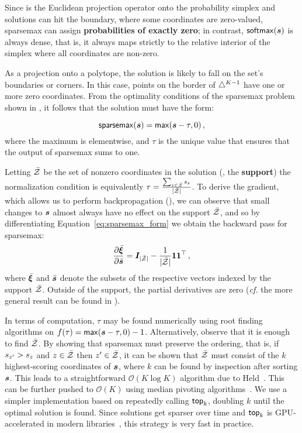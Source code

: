 Since
 is the Euclidean projection operator onto the probability
simplex and solutions can hit the boundary, where some coordinates are zero-valued, sparsemax can assign {\bf
        probabilities of exactly zero}; in contrast, $\softmax(\s)$
is always dense, that is, it always maps strictly
to the relative interior of the simplex where all coordinates are non-zero.

As a projection onto a polytope, the solution is likely to fall on the
set's boundaries or corners. In this case, points on the border of
$\simplex^{K-1}$ have one or more zero coordinates.
From the optimality conditions of the sparsemax problem shown in ,
it follows that the solution must have the form:

\begin{lemma}
    \begin{equation}\label{eq:sparsemax_form}
        \sparsemax(\s) = \max(\s - \tau, 0)\,,
    \end{equation}
    where the maximum is elementwise, and $\tau$ is the unique value that
    ensures that the output of sparsemax sums to one.
\end{lemma}

Letting $\bar{\ZZ}$ be the set of
nonzero coordinates in the solution (\ie, the \textbf{support}) the
normalization condition is equivalently $\tau = \frac{\sum_{z \in
            \bar{\ZZ}} \ss_z}{|\bar{\ZZ}|}$.
To derive the gradient, which allows us to perform backpropagation
(), we can observe that small changes to $\s$ almost always have no effect on the support
$\bar{\ZZ}$, and so by differentiating Equation~\ref{eq:sparsemax_form} we obtain the backward pass for sparsemax:
\begin{equation}
    \pfrac{\bar{\pv}}{\bar{\s}} = \bm{I}_{|\bar{\ZZ}|} - \frac{1}{|\bar{\ZZ}|}
    \bm{11}^\top\,,
\end{equation}
where $\bar{\pv}$ and ${\bar{\s}}$ denote the subsets of the respective vectors
indexed by the support $\bar{\ZZ}$. Outside of the support, the partial
derivatives are zero (\emph{cf.} the more general result can be found in \citet[Proposition
    2]{entmax}).

In terms of computation, $\tau$ may be found numerically using root finding
algorithms on $f(\tau) = \max(\s - \tau, 0) - 1$.
Alternatively, observe that it is enough to find $\bar{\ZZ}$. By showing that
sparsemax must preserve the ordering, that is, if $\ss_{z'} > \ss_z$ and $z \in
    \bar{\ZZ}$ then $z' \in \bar{\ZZ}$, it can be shown that $\bar{\ZZ}$ must
consist of the $k$ highest-scoring coordinates of $\s$, where $k$ can be found by
inspection after sorting $\s$. This leads to a straightforward $\mathcal{O}(K
    \log K)$ algorithm due to Held~\citep[pp.~16--17]{Held1974}. This can be further pushed to
$\mathcal{O}(K)$ using median pivoting algorithms~\citep{Condat2016, entmax}. We use
a simpler implementation based on repeatedly calling $\topk$,
doubling $k$ until the optimal solution is found. Since solutions get sparser
over time and $\topk$ is GPU-accelerated
in modern libraries~\citep{pytorch}, this strategy is very fast in practice.


